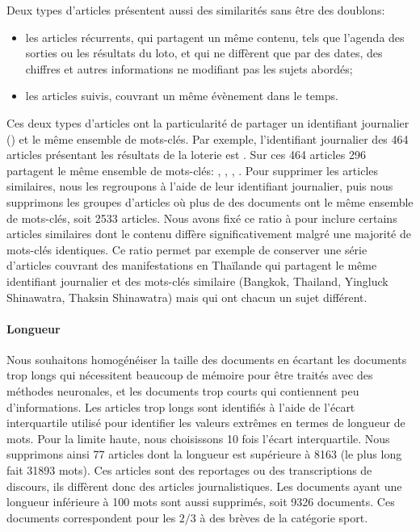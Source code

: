 Deux types d'articles présentent aussi des similarités sans être des doublons: 
\begin{itemize}
    \item les articles récurrents, qui partagent un même contenu, tels que l'agenda des sorties ou les résultats du loto, et qui ne diffèrent que par des dates, des chiffres et autres informations ne modifiant pas les sujets abordés;
    \item les articles suivis, couvrant un même évènement dans le temps.
\end{itemize}
Ces deux types d'articles ont la particularité  de partager un  identifiant journalier () et le même ensemble de mots-clés.
Par exemple, l'identifiant journalier des 464 articles présentant les résultats de la loterie est . Sur ces 464 articles 296 partagent le même ensemble de mots-clés: , , , .
Pour supprimer les articles similaires, nous les regroupons à l'aide de leur identifiant journalier, puis nous supprimons les groupes d'articles où plus de  des documents ont le même ensemble de mots-clés, soit \num{2533} articles. 
Nous avons fixé ce ratio à  pour inclure certains articles similaires dont le contenu diffère significativement malgré une majorité de mots-clés identiques.
Ce ratio permet par exemple de conserver une série d'articles couvrant des manifestations en Thaïlande qui partagent le même identifiant journalier  et des mots-clés similaire (Bangkok, Thailand, Yingluck Shinawatra, Thaksin Shinawatra) mais qui ont chacun un sujet différent.


\paragraph{Longueur}
Nous souhaitons homogénéiser la taille des documents en écartant les documents trop longs qui nécessitent beaucoup de mémoire pour être traités avec des méthodes neuronales, et les documents trop courts qui contiennent peu d'informations.
Les articles trop longs sont identifiés à l'aide de l'écart interquartile utilisé pour identifier les valeurs extrêmes en termes de longueur de mots. Pour la limite haute, nous choisissons 10 fois l'écart interquartile.
Nous supprimons ainsi 77 articles dont la longueur est supérieure à \num{8163} (le plus long fait \num{31893} mots). Ces articles sont des reportages ou des transcriptions de discours, ils diffèrent donc des articles journalistiques.
Les documents ayant une longueur inférieure à 100 mots sont aussi supprimés, soit \num{9326} documents. Ces documents correspondent pour les $2/3$ à des brèves de la catégorie sport.


